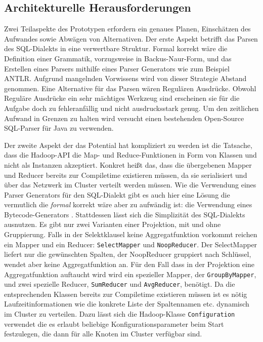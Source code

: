 \documentclass[a4paper]{article}
\begin{document}
\subsection{Architekturelle Herausforderungen}
Zwei Teilaspekte des Prototypen erfordern ein genaues Planen, Einschätzen des Aufwandes sowie Abwägen von Alternativen. Der erste Aspekt betrifft das Parsen des SQL-Dialekts in eine verwertbare Struktur. Formal korrekt wäre die Definition einer Grammatik, vorzugsweise in Backus-Naur-Form, und das Erstellen eines Parsers mithilfe eines Parser Generators wie zum Beispiel ANTLR. Aufgrund mangelnden Vorwissens wird von dieser Strategie Abstand genommen. Eine Alternative für das Parsen wären Regulären Ausdrücke. Obwohl Reguläre Ausdrücke ein sehr mächtiges Werkzeug sind erscheinen sie für die Aufgabe doch zu fehleranfällig und nicht ausdrucksstark genug. Um den zeitlichen Aufwand in Grenzen zu halten wird versucht einen bestehenden Open-Source SQL-Parser \cite{SQLParser} für Java zu verwenden.

Der zweite Aspekt der das Potential hat kompliziert zu werden ist die Tatsache, dass die Hadoop-API die Map- und Reduce-Funktionen in Form von Klassen und nicht als Instanzen akzeptiert. Konkret heißt das, dass die übergebenen Mapper und Reducer bereits zur Compiletime existieren müssen, da sie serialisiert und über das Netzwerk im Cluster verteilt werden müssen. Wie die Verwendung eines Parser Generators für den SQL-Dialekt gibt es auch hier eine Lösung die vermutlich die \textit{formal} korrekt wäre aber zu aufwändig ist: die Verwendung eines Bytecode-Generators \cite{Bytecode}. Stattdessen lässt sich die Simplizität des SQL-Dialekts ausnutzen. Es gibt nur zwei Varianten einer Projektion, mit und ohne Gruppierung. Falls in der Selektklausel keine Aggregatfunktion vorkommt reichen ein Mapper und ein Reducer: \texttt{SelectMapper} und \texttt{NoopReducer}. Der SelectMapper liefert nur die gewünschten Spalten, der NoopReducer gruppiert nach Schlüssel, wendet aber keine Aggregatfunktion an. Für den Fall dass in der Projektion eine Aggregatfunktion auftaucht wird wird ein spezieller Mapper, der \texttt{GroupByMapper}, und zwei spezielle Reducer, \texttt{SumReducer} und \texttt{AvgReducer}, benötigt. Da die entsprechenden Klassen bereits zur Compiletime existieren müssen ist es nötig Laufzeitinformationen wie die konkrete Liste der Spaltennamen etc. dynamisch im Cluster zu verteilen. Dazu lässt sich die Hadoop-Klasse \texttt{Configuration} verwendet die es erlaubt beliebige Konfigurationsparameter beim Start festzulegen, die dann für alle Knoten im Cluster verfügbar sind.

\newpage
\nocite{GOOGLE-TENZING}
\nocite{GOOGLE-MAPREDUCE}
\nocite{GOOGLE-GFS}
\nocite{KemperEickler}
\nocite{KandziaKlein}
\nocite{Selinger}
\nocite{Zeller}
\nocite{Ioannidis}
\printbibliography

\newpage
{}
\listoffigures

\listoftables

\renewcommand\listoflistingscaption{Quellcodeverzeichnis}
\listoflistings
\end{document}
